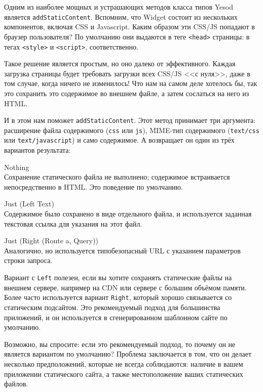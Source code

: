 Одним из наиболее мощных и устрашающих методов класса типов Yesod является \lstinline!addStaticContent!. Вспомним, что Widget состоит из нескольких компонентов, включая CSS и Javascript. Каким образом эти CSS/JS попадают в браузер пользователя? По умолчанию они выдаются в теге \lstinline!<head>! страницы: в тегах \lstinline!<style>! и \lstinline!<script>!, соответственно.

Такое решение является простым, но оно далеко от эффективного. Каждая загрузка страницы будет требовать загрузки всех CSS/JS <<с нуля>>, даже в том случае, когда ничего не изменилось! Что нам на самом деле хотелось бы, так это сохранить это содержимое во внешнем файле, а затем сослаться на него из HTML.

И в этом нам поможет \lstinline!addStaticContent!. Этот метод принимает три аргумента: расширение файла содержимого (\lstinline!css! или \lstinline!js!), MIME-тип содержимого (\lstinline!text/css! или \lstinline!text/javascript!) и само содержимое. А возвращает он один из трёх вариантов результата:

\begin{description}
  \item {Nothing}  \hfill \\
    Сохранение статического файла не выполнено; содержимое встраивается непосредственно в HTML. Это поведение по умолчанию.
  \item {Just (Left Text)} \hfill \\
    Содержимое было сохранено в виде отдельного файла, и используется заданная текстовая ссылка для указания на этот файл.
  \item {Just (Right (Route a, Query))} \hfill \\
    Аналогично, но используется типобезопасный URL с указанием параметров строки запроса.
\end{description}

Вариант с \lstinline!Left! полезен, если вы хотите сохранять статические файлы на внешнем сервере, например на CDN или сервере с большим объёмом памяти. Более часто используется вариант \lstinline!Right!, который хорошо связывается со статическим подсайтом. Это рекомендуемый подход для большинства приложений, и он используется в сгенерированном шаблонном сайте по умолчанию.

\begin{remark}
Возможно, вы спросите: если это рекомендуемый подход, то почему он не является вариантом по умолчанию? Проблема заключается в том, что он делает несколько предположений, которые не всегда соблюдаются: наличие в вашем приложении статического сайта, а также местоположение ваших статических файлов.
\end{remark}

